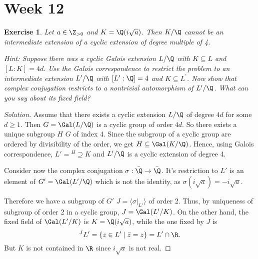 \documentclass[a4paper,10pt,reqno]{amsart}
\newtheorem{ex}{Exercise}[section]
\newenvironment{sol}
  {\renewcommand\qedsymbol{$\blacksquare$}\begin{proof}[Solution]}
  {\end{proof}}
\begin{document}
\newpage
\section{Week 12}

\begin{ex}
\label{12.1}
    Let $a\in\Z_{>0}$ and $K=\Q(i\sqrt{a})$.
    Then $K/\Q$ cannot be an intermediate extension
    of a cyclic extension of degree multiple of 4. 

    \noindent \textit{Hint:} Suppose there was a cyclic Galois extension $L/\Q$ with $K \subseteq L$ and $[L:K] = 4d$. Use the Galois correspondence to restrict the problem to an intermediate extension $L^{\prime}/\Q$ with $[L^{\prime}:\Q] = 4$ and $K \subseteq L^{\prime}$. Now show that complex conjugation restricts to a nontrivial automorphism of $L^{\prime}/\Q$. What can you say about its fixed field?
\end{ex}

\begin{sol}
    Assume that there exists a cyclic extension
    $L/\Q$ of degree $4d$ for some $d\geq 1$.
    Then $G=\Gal(L/\Q)$ is a cyclic group of order
    $4d$. So there exists a unique subgroup $H$
    $G$ of index 4.
    Since the subgroup of a cyclic group are ordered by divisibility of the order, we get
    $H\subseteq \Gal(K/\Q)$.
    Hence, using Galois correspondence,
    $L'={}^H\supseteq K$ and $L'/\Q$ is a cyclic 
    extension of degree 4.

    Consider now the complex conjugation 
    $\sigma: \Bar{\Q}\to \Bar{\Q}$.
    It's restriction to $L'$ is an element of
    $G'=\Gal(L'/\Q)$ which is not the identity,
    as $\sigma(i\sqrt{a})=-i\sqrt{a}$.

Therefore we have a subgroup of $G'$
$J=\langle \sigma|_{L'}\rangle$ of order 2.
Thus, by uniqueness of subgroup of order 2 in
a cyclic group, $J=\Gal(L'/K)$.
On the other hand, the fixed field of 
$\Gal(L'/K)$ is $K=\Q(i\sqrt{a})$, while the one fixed by $J$ is
$${}^J L'=\{z\in L'\mid \Bar{z}=z\}=L'\cap\R.$$
But $K$ is not contained in $\R$ since 
$i\sqrt{a}$ is not real.
\end{sol}
\end{document}
